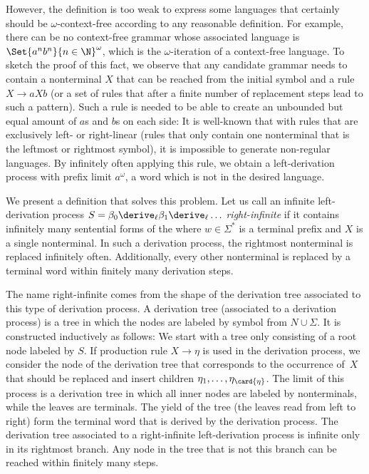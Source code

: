 \documentclass[../../diss.tex]{subfiles}
\begin{document}
However, the definition is too weak to express some languages that certainly should be $\omega$-context-free according to any reasonable definition.
For example, there can be no context-free grammar whose associated language is $\Set{a^n b^n}{n \in \N}^\omega$, which is the $\omega$-iteration of a context-free language.
To sketch the proof of this fact, we observe that any candidate grammar needs to contain a nonterminal $X$ that can be reached from the initial symbol and a rule $X \to aXb$ (or a set of rules that after a finite number of replacement steps lead to such a pattern).
Such a rule is needed to be able to create an unbounded but equal amount of $a$s and $b$s on each side: It is well-known that with rules that are exclusively left- or right-linear (rules that only contain one nonterminal that is the leftmost or rightmost symbol), it is impossible to generate non-regular languages.
By infinitely often applying this rule, we obtain a left-derivation process with prefix limit $a^\omega$, a word which is not in the desired language.

We present a definition that solves this problem.
Let us call an infinite left-derivation process $S = \beta_0 \leftderive \beta_1 \leftderive \ldots$ \emph{right-infinite} if it contains infinitely many sentential forms of the  where $w \in \Sigma^*$ is a terminal prefix and $X$ is a single nonterminal.
In such a derivation process, the rightmost nonterminal is replaced infinitely often.
Additionally, every other nonterminal is replaced by a terminal word within finitely many derivation steps.

The name right-infinite comes from the shape of the derivation tree associated to this type of derivation process.
A derivation tree (associated to a derivation process) is a tree in which the nodes are labeled by symbol from $N \cup \Sigma$.
It is constructed inductively as follows:
We start with a tree only consisting of a root node labeled by $S$.
If production rule $X \to \eta$ is used in the derivation process, we consider the node of the derivation tree that corresponds to the occurrence of~$X$ that should be replaced and insert children $\eta_1, \ldots, \eta_{\card{\eta}}$.
The limit of this process is a derivation tree in which all inner nodes are labeled by nonterminals, while the leaves are terminals.
The yield of the tree (the leaves read from left to right) form the terminal word that is derived by the derivation process.
The derivation tree associated to a right-infinite left-derivation process is infinite only in its rightmost branch.
Any node in the tree that is not this branch can be reached within finitely many steps.
\end{document}
